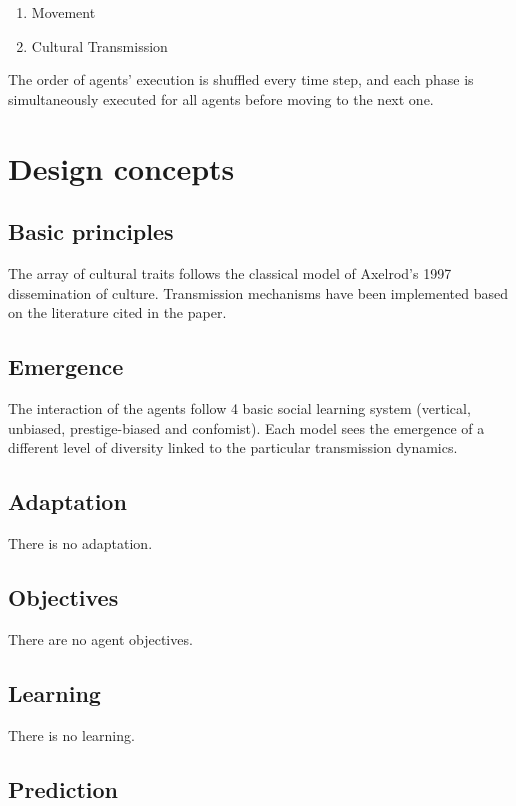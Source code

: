 \documentclass[11pt,a4paper,twocolumn,notitlepage]{article}
\begin{document}
\begin{enumerate}
\item{Movement}
\item{Cultural Transmission}
\end{enumerate}

The order of agents' execution is shuffled every time step, and each phase is simultaneously executed for all agents before moving to the next one.


\section{Design concepts}

\subsection{Basic principles}

The array of cultural traits follows the classical model of Axelrod's 1997 dissemination of culture. Transmission mechanisms have been implemented based on the literature cited in the paper.

\subsection{Emergence}

The interaction of the agents follow 4 basic social learning system (vertical, unbiased, prestige-biased and confomist). Each model sees the emergence of a different level of diversity linked to the particular transmission dynamics. 

\subsection{Adaptation}

There is no adaptation.

\subsection{Objectives}

There are no agent objectives.

\subsection{Learning}

There is no learning.

\subsection{Prediction}
\end{document}
